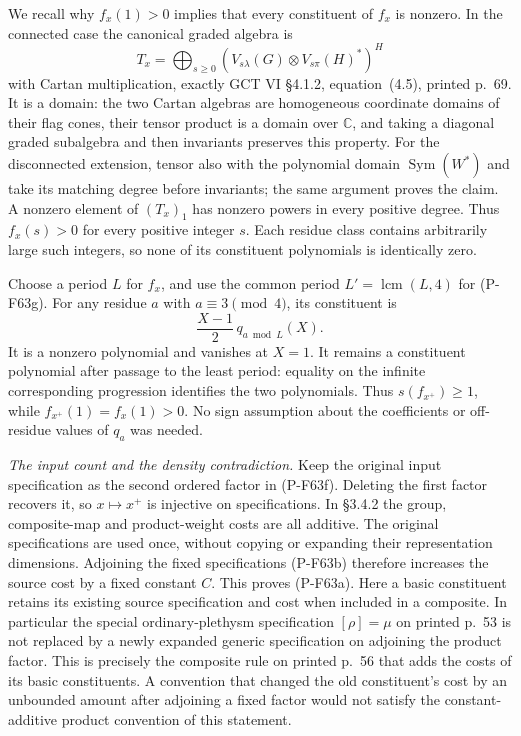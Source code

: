 We recall why $f_x(1)>0$ implies that every constituent of
$f_x$ is nonzero.  In the connected case the canonical graded
algebra is
\[
 T_x=\bigoplus_{s\ge0}
       (V_{s\lambda}(G)\otimes V_{s\pi}(H)^*)^H
                                                        \tag{P-F63h}
\]
with Cartan multiplication, exactly GCT VI \S4.1.2,
equation~(4.5), printed p.~69.  It is a domain: the two Cartan
algebras are homogeneous coordinate domains of their flag cones,
their tensor product is a domain over $\mathbb C$, and taking
a diagonal graded subalgebra and then invariants preserves this
property.  For the disconnected extension, tensor also with the
polynomial domain $\operatorname{Sym}(W^*)$ and take its matching
degree before invariants; the same argument proves the claim.
A nonzero element of $(T_x)_1$ has nonzero powers in every
positive degree.  Thus $f_x(s)>0$ for every positive integer $s$.
Each residue class contains arbitrarily large such integers,
so none of its constituent polynomials is identically zero.

Choose a period $L$ for $f_x$, and use the common period
$L'=\operatorname{lcm}(L,4)$ for (P-F63g).
For any residue $a$ with $a\equiv3\pmod4$, its constituent is
\[
                \frac{X-1}{2}\,q_{a\bmod L}(X).
                                                        \tag{P-F63i}
\]
It is a nonzero polynomial and vanishes at $X=1$.
It remains a constituent polynomial after passage to the least
period: equality on the infinite corresponding progression
identifies the two polynomials.  Thus $s(f_{x^+})\ge1$,
while $f_{x^+}(1)=f_x(1)>0$.  No sign assumption about the
coefficients or off-residue values of $q_a$ was needed.

\emph{The input count and the density contradiction.}
Keep the original input specification as the second ordered
factor in (P-F63f).  Deleting the first factor recovers it, so
$x\mapsto x^+$ is injective on specifications.  In \S3.4.2
the group, composite-map and product-weight costs are all
additive.  The original specifications are used once, without
copying or expanding their representation dimensions.
Adjoining the fixed specifications (P-F63b) therefore increases
the source cost by a fixed constant $C$.  This proves (P-F63a).
Here a basic constituent retains its existing source specification
and cost when included in a composite.  In particular the special
ordinary-plethysm specification $[\rho]=\mu$ on printed p.~53
is not replaced by a newly expanded generic specification on
adjoining the product factor.  This is precisely the composite
rule on printed p.~56 that adds the costs of its basic
constituents.  A convention that changed the old constituent's
cost by an unbounded amount after adjoining a fixed factor would
not satisfy the constant-additive product convention of this
statement.

